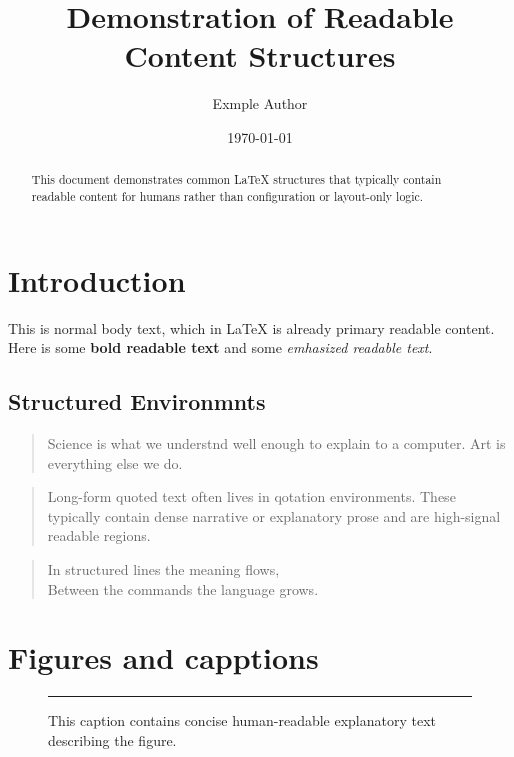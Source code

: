 \documentclass{article}
\title{Demonstration of Readable Content Structures}
\author{Exmple Author}
\date{\today}
\begin{document}
\maketitle

\begin{abstract}
This document demonstrates common LaTeX structures that typically contain readable content for humans rather than configuration or layout-only logic.
\end{abstract}

\section{Introduction}

This is normal body text, which in LaTeX is already primary readable content. 
Here is some \textbf{bold readable text} and some \emph{emhasized readable text}.

\subsection{Structured Environmnts}

\begin{quote}
Science is what we understnd well enough to explain to a computer. Art is everything else we do.
\end{quote}

\begin{quotation}
Long-form quoted text often lives in qotation environments. These typically contain dense narrative or explanatory prose and are high-signal readable regions.
\end{quotation}

\begin{verse}
In structured lines the meaning flows,\\
Between the commands the language grows.
\end{verse}

\section{Figures and capptions}

\begin{figure}[h]
\centering
\rule{6cm}{3cm}
\caption{This caption contains concise human-readable explanatory text describing the figure.}
\end{figure}
\end{document}
